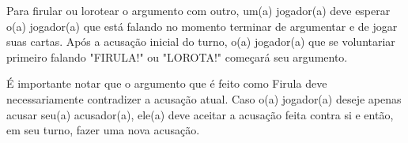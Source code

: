 \documentclass[a4paper, 11pt]{article}
\begin{document}
	Para firular ou lorotear o argumento com outro, um(a) jogador(a) deve esperar o(a) jogador(a) que está falando no momento terminar de argumentar e de jogar suas cartas. Após a acusação inicial do turno, o(a) jogador(a) que se voluntariar primeiro falando "FIRULA!" ou "LOROTA!" começará seu argumento.

	É importante notar que o argumento que é feito como Firula deve necessariamente contradizer a acusação atual. Caso o(a) jogador(a) deseje apenas acusar seu(a) acusador(a), ele(a) deve aceitar a acusação feita contra si e então, em seu turno, fazer uma nova acusação.

\end{document}
